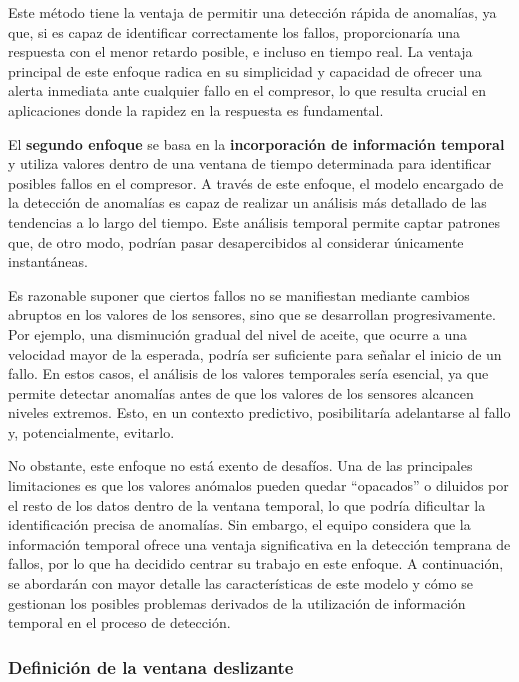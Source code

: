 \documentclass[12pt,letterpaper]{article}
\begin{document}
Este método tiene la ventaja de permitir una detección rápida de anomalías, ya que, si es capaz de identificar correctamente los fallos, proporcionaría una respuesta con el menor retardo posible, e incluso en tiempo real. La ventaja principal de este enfoque radica en su simplicidad y capacidad de ofrecer una alerta inmediata ante cualquier fallo en el compresor, lo que resulta crucial en aplicaciones donde la rapidez en la respuesta es fundamental.

El \textbf{segundo enfoque} se basa en la \textbf{incorporación de información temporal} y utiliza valores dentro de una ventana de tiempo determinada para identificar posibles fallos en el compresor. A través de este enfoque, el modelo encargado de la detección de anomalías es capaz de realizar un análisis más detallado de las tendencias a lo largo del tiempo. Este análisis temporal permite captar patrones que, de otro modo, podrían pasar desapercibidos al considerar únicamente instantáneas.

Es razonable suponer que ciertos fallos no se manifiestan mediante cambios abruptos en los valores de los sensores, sino que se desarrollan progresivamente. Por ejemplo, una disminución gradual del nivel de aceite, que ocurre a una velocidad mayor de la esperada, podría ser suficiente para señalar el inicio de un fallo. En estos casos, el análisis de los valores temporales sería esencial, ya que permite detectar anomalías antes de que los valores de los sensores alcancen niveles extremos. Esto, en un contexto predictivo, posibilitaría adelantarse al fallo y, potencialmente, evitarlo.

No obstante, este enfoque no está exento de desafíos. Una de las principales limitaciones es que los valores anómalos pueden quedar ``opacados'' o diluidos por el resto de los datos dentro de la ventana temporal, lo que podría dificultar la identificación precisa de anomalías. Sin embargo, el equipo considera que la información temporal ofrece una ventaja significativa en la detección temprana de fallos, por lo que ha decidido centrar su trabajo en este enfoque. A continuación, se abordarán con mayor detalle las características de este modelo y cómo se gestionan los posibles problemas derivados de la utilización de información temporal en el proceso de detección.

\subsubsection{Definición de la ventana deslizante}
\end{document}

